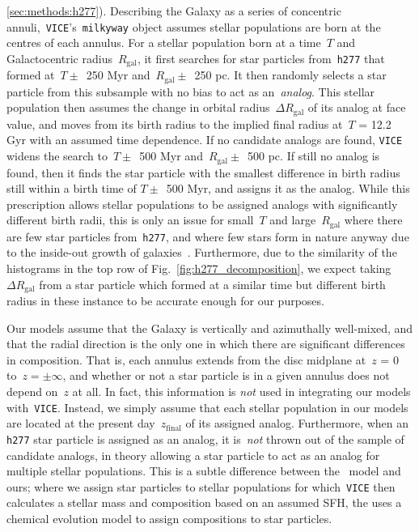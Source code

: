 \documentclass[fleqn, usenatbib]{mnras}
\begin{document}
\ref{sec:methods:h277}). Describing the Galaxy as a series of concentric 
annuli,~\texttt{VICE}'s~\texttt{milkyway} object assumes stellar populations 
are born at the centres of each annulus. For a stellar population born at a 
time~$T$ and Galactocentric radius~$R_\text{gal}$, it first searches for star 
particles from~\texttt{h277} that formed at~$T \pm$~250 Myr and~$R_\text{gal} 
\pm$~250 pc. It then randomly selects a star particle from this subsample with 
no bias to act as an~\textit{analog}. This stellar population then assumes the 
change in orbital radius~$\Delta R_\text{gal}$ of its analog at face value, 
and moves from its birth radius to the implied final radius at~$T$ = 12.2 Gyr 
with an assumed time dependence. If no candidate analogs are found, 
\texttt{VICE} widens the search to~$T \pm$~500 Myr and~$R_\text{gal} \pm$~500 
pc. If still no analog is found, then it finds the star particle 
with the smallest difference in birth radius still within a birth time of 
$T \pm$~500 Myr, and assigns it as the analog. 
While this prescription allows stellar populations to be assigned analogs with 
significantly different birth radii, this is only an issue for small~$T$ and 
large~$R_\text{gal}$ where there are few star particles from~\texttt{h277}, 
and where few stars form in nature anyway due to the inside-out growth of 
galaxies~\citep{Bird2013}. Furthermore, due to the similarity of the histograms 
in the top row of Fig.~\ref{fig:h277_decomposition}, we expect taking 
$\Delta R_\text{gal}$ from a star particle which formed at a similar time but 
different birth radius in these instance to be accurate enough for our 
purposes. 
\par 
Our models assume that the Galaxy is vertically and azimuthally well-mixed, and 
that the radial direction is the only one in which there are significant 
differences in composition. That is, each annulus extends from the disc 
midplane at~$z$ = 0 to~$z = \pm \infty$, and whether or not a star particle is 
in a given annulus does not depend on~$z$ at all. In fact, this information is 
\textit{not} used in integrating our models with~\texttt{VICE}. Instead, we 
simply assume that each stellar population in our models are located at the 
present day~$z_\text{final}$ of its assigned analog. Furthermore, when an 
\texttt{h277} star particle is assigned as an analog, it is~\textit{not} 
thrown out of the sample of candidate analogs, in theory allowing a star 
particle to act as an analog for multiple stellar populations. This is a 
subtle difference between the~\citet{Minchev2013} model and ours; where we 
assign star particles to stellar populations for which~\texttt{VICE} then 
calculates a stellar mass and composition based on an assumed SFH, the 
\citet{Minchev2013} uses a chemical evolution model to assign compositions to 
star particles. 
\end{document}
